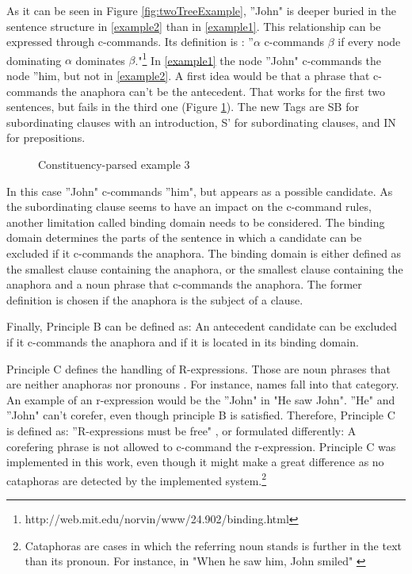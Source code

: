 As it can be seen in Figure \ref{fig:twoTreeExample}, ''John" is deeper buried in the sentence structure in \ref{example2} than in \ref{example1}. This relationship can be expressed through c-commands. Its definition is : ''$\alpha$ c-commands $\beta$ if every node dominating $\alpha$ dominates $\beta$."\footnote{http://web.mit.edu/norvin/www/24.902/binding.html} In \ref{example1} the node ''John" c-commands the node ''him, but not in \ref{example2}. A first idea would be that a phrase that c-commands the anaphora can't be the antecedent. That works for the first two sentences, but fails in the third one (Figure \ref{fig:ExampleTreeThree}). The new Tags are SB for subordinating clauses with an introduction, S' for subordinating clauses, and IN for prepositions.

\begin{figure}[h]
    \centering\sffamily
{}
    \caption{Constituency-parsed example 3}%
    \label{fig:ExampleTreeThree}%
\end{figure}

In this case ''John" c-commands ''him", but appears as a possible candidate. As the subordinating clause seems to have an impact on the c-command rules, another limitation called binding domain needs to be considered. The binding domain determines the parts of the sentence in which a candidate can be excluded if it c-commands the anaphora. The binding domain is either defined as the smallest clause containing the anaphora, or the smallest clause containing the anaphora and a noun phrase that c-commands the anaphora. The former definition is chosen if the anaphora is the subject of a clause. 

Finally, Principle B can be defined as: An antecedent candidate can be excluded if it c-commands the anaphora and if it is located in its binding domain.

Principle C defines the handling of R-expressions. Those are noun phrases that are neither anaphoras nor pronouns \citep{crystal2011dictionary}. For instance, names fall into that category. An example of an r-expression would be the ''John" in "He saw John". ''He" and ''John" can't corefer, even though principle B is satisfied. Therefore, Principle C is defined as: ''R-expressions must be free" \citep{chomsky1993lectures}, or formulated differently: A corefering phrase is not allowed to c-command the r-expression. Principle C was implemented in this work, even though it might make a great difference as no cataphoras are detected by the implemented system.\footnote{Cataphoras are cases in which the referring noun stands is further in the text than its pronoun. For instance, in "When he saw him, John smiled" \citep[p. 10]{cutting2005pragmatics}}

